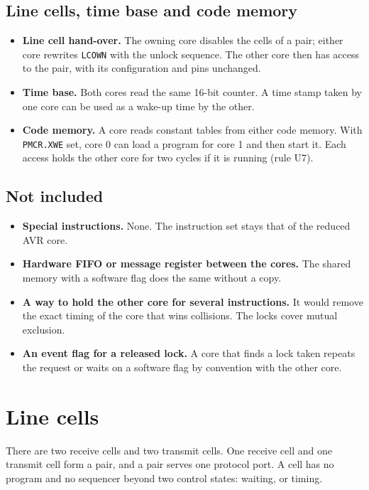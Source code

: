 \documentclass[10pt,a4paper]{article}
\newcommand{\reg}[1]{\texttt{#1}}
\begin{document}
\subsection{Line cells, time base and code memory}

\begin{itemize}
\item \textbf{Line cell hand-over.} The owning core disables the cells of a pair; either core rewrites \reg{LCOWN} with the unlock sequence. The other core then has access to the pair, with its configuration and pins unchanged.
\item \textbf{Time base.} Both cores read the same 16-bit counter. A time stamp taken by one core can be used
as a wake-up time by the other.
\item \textbf{Code memory.} A core reads constant tables from either code memory. With \reg{PMCR.XWE} set, core 0
can load a program for core 1 and then start it. Each access holds the other core for two cycles if it is running (rule U7).
\end{itemize}

\subsection{Not included}

\begin{itemize}
\item \textbf{Special instructions.} None. The instruction set stays that of the reduced AVR core.
\item \textbf{Hardware FIFO or message register between the cores.} The shared memory with a software flag does
the same without a copy.
\item \textbf{A way to hold the other core for several instructions.} It would remove the exact timing of the
core that wins collisions. The locks cover mutual exclusion.
\item \textbf{An event flag for a released lock.} A core that finds a lock taken repeats the request or waits on
a software flag by convention with the other core.
\end{itemize}

\section{Line cells}

There are two receive cells and two transmit cells. One receive cell and one transmit cell form a pair, and a
pair serves one protocol port. A cell has no program and no sequencer beyond two control states: waiting, or
timing.
\end{document}
